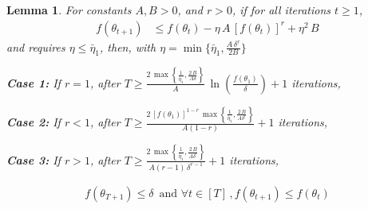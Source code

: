 \documentclass[10pt,a4paper]{amsart}
\newtheorem{lemma}{Lemma}
\newcommand{\tht}{\theta_t}
\newcommand{\thtt}{\theta_{t+1}}
\begin{document}
\begin{lemma}
For constants $A, B > 0$, and $r > 0$,  if for all iterations $t \geq 1$, 
\begin{align*}
f(\thtt) & \leq f(\tht) - \eta \, A \, [f(\tht)]^{r} + \eta^2 \, B 
\end{align*}
and requires $\eta \leq \bar{\eta}_1$, then, with $\eta = \min\{\bar{\eta}_1, \frac{A \, \delta^r}{2B} \}$

\textbf{Case 1:} If $r = 1$, after $T \geq \frac{2 \, \max\left\{\frac{1}{\bar{\eta}_1}, \frac{2 \, B}{A \delta}\right\}}{A} \, \ln\left(\frac{f(\theta_1)}{\delta}\right) + 1$ iterations, 

\textbf{Case 2:} If $r < 1$, after $T \geq \frac{2 \, [f(\theta_1)]^{1-r} \, \max\left\{\frac{1}{\bar{\eta}_1}, \frac{2 \, B}{A \delta^r}\right\}}{A (1-r)} + 1$ iterations, 

\textbf{Case 3:} If $r > 1$, after $T \geq \frac{2 \, \max\left\{\frac{1}{\bar{\eta}_1}, \frac{2 \, B}{A \delta^r}\right\}}{A (r-1) \, \delta^{r-1}} + 1$ iterations, 


\begin{align}
f(\theta_{T+1}) \leq \delta \, \text{ and } \forall t \in [T] \,, f(\thtt) \leq f(\tht)
\end{align}
\label{lemma:sd-p2}
\end{lemma}
\end{document}
